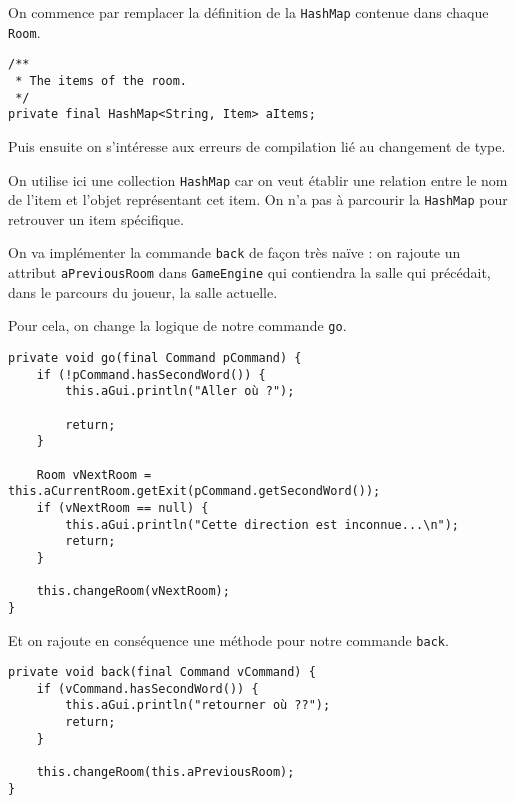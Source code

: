 \begin{exercise}[subtitle=Items]

On commence par remplacer la définition de la \verb|HashMap| contenue dans chaque \verb|Room|.

\begin{verbatim}
/**
 * The items of the room.
 */
private final HashMap<String, Item> aItems;
\end{verbatim}

Puis ensuite on s'intéresse aux erreurs de compilation lié au changement de type.

On utilise ici une collection \verb|HashMap| car on veut établir une relation entre le nom de l'item et l'objet représentant cet item. On n'a pas à parcourir la \verb|HashMap| pour retrouver un item spécifique.
\end{exercise}

\begin{exercise}[subtitle=Commande back]

On va implémenter la commande \verb|back| de façon très naïve : on rajoute un attribut \verb|aPreviousRoom| dans \verb|GameEngine| qui contiendra la salle qui précédait, dans le parcours du joueur, la salle actuelle.

Pour cela, on change la logique de notre commande \verb|go|.

\begin{verbatim}
private void go(final Command pCommand) {
    if (!pCommand.hasSecondWord()) {
        this.aGui.println("Aller où ?");

        return;
    }

    Room vNextRoom = this.aCurrentRoom.getExit(pCommand.getSecondWord());
    if (vNextRoom == null) {
        this.aGui.println("Cette direction est inconnue...\n");
        return;
    }

    this.changeRoom(vNextRoom);
}
\end{verbatim}

Et on rajoute en conséquence une méthode pour notre commande \verb|back|.

\begin{verbatim}
private void back(final Command vCommand) {
    if (vCommand.hasSecondWord()) {
        this.aGui.println("retourner où ??");
        return;
    }

    this.changeRoom(this.aPreviousRoom);
}
\end{verbatim}
\end{exercise}

